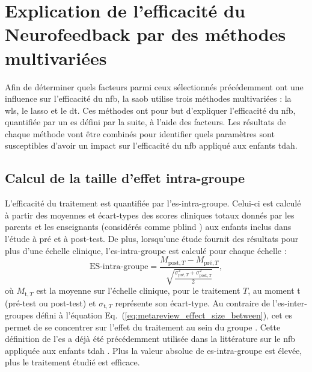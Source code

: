 \section{Explication de l'efficacité du Neurofeedback par des méthodes multivariées}

Afin de déterminer quels facteurs parmi ceux sélectionnés précédemment ont une influence sur l'efficacité du \gls{nfb}, la \gls{saob} utilise trois méthodes multivariées : 
la \gls{wls}, le \gls{lasso} et le \gls{dt}. Ces méthodes ont pour but d'expliquer l'efficacité du \gls{nfb}, quantifiée par un \gls{es}
défini par la suite, à l'aide des facteurs. Les résultats de chaque méthode vont être combinés pour identifier quels paramètres sont susceptibles 
d'avoir un impact sur l'efficacité du \gls{nfb} appliqué aux enfants \gls{tdah}. 

\subsection{Calcul de la taille d'effet intra-groupe} \label{es_within}

L'efficacité du traitement est quantifiée par l'\gls{es}-intra-groupe. Celui-ci est calculé à partir des moyennes et écart-types des scores 
cliniques totaux donnés par les parents et les enseignants (considérés comme \gls{pblind} \citep{Sonuga-Barke2013, Micoulaud2014, Cortese2016}) aux enfants inclus dans 
l'étude à pré et à post-test. De plus, 
lorsqu'une étude fournit des résultats pour plus d'une échelle clinique, l'\gls{es}-intra-groupe est calculé pour chaque échelle :
\begin{equation}
\label{eq:factors_effect_size_within_subject}
\text{ES-intra-groupe} = \frac{M_{\text{post},T} - M_{\text{pré},T}}{\sqrt{\frac{\sigma_{\text{pré},T}^2 + \sigma_{\text{post},T}^2}{2}}},
\end{equation} 
\noindent où $M_{\text{t},T}$ est la moyenne sur l'échelle clinique, pour le traitement $T$, au moment t (pré-test ou post-test) et $\sigma_{\text{t},T}$ représente
son écart-type. Au contraire de l'\gls{es}-inter-groupes défini à l'équation Eq.~(\ref{eq:metareview_effect_size_between}), cet \gls{es} permet de se concentrer sur l'effet du 
traitement au sein du groupe \citep{Cohen1988}. Cette définition de l'\gls{es} a déjà été précédemment utilisée dans la littérature sur le \gls{nfb} 
appliquée aux enfants \gls{tdah} \citep{Arns2009, Maurizio2014, Strehl2017}. Plus la valeur absolue de \gls{es}-intra-groupe est élevée, plus
le traitement étudié est efficace. 

